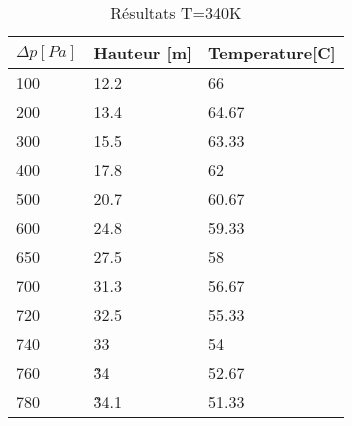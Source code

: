 \begin{table}[h]
    \centering
    \caption{Résultats T=340K}
    \begin{tabular}{|l|l|l|}
	\hline
	$\Delta p [Pa]$	&Hauteur [m] &Temperature[C\degree]\\
	\hline
	100	&12.2 &   66   \\
	200	&13.4 &   64.67\\
	300	&15.5 &   63.33\\
	400	&17.8 &   62   \\
	500	&20.7 &   60.67\\
	600	&24.8 &   59.33\\
	650	&27.5 &   58   \\
	700	&31.3 &   56.67\\
	720	&32.5 &   55.33\\
	740	&33   &   54   \\
	760	&\~34   & 52.67\\
	780	&\~34.1 & 51.33\\
	\hline
    \end{tabular}
\end{table}
